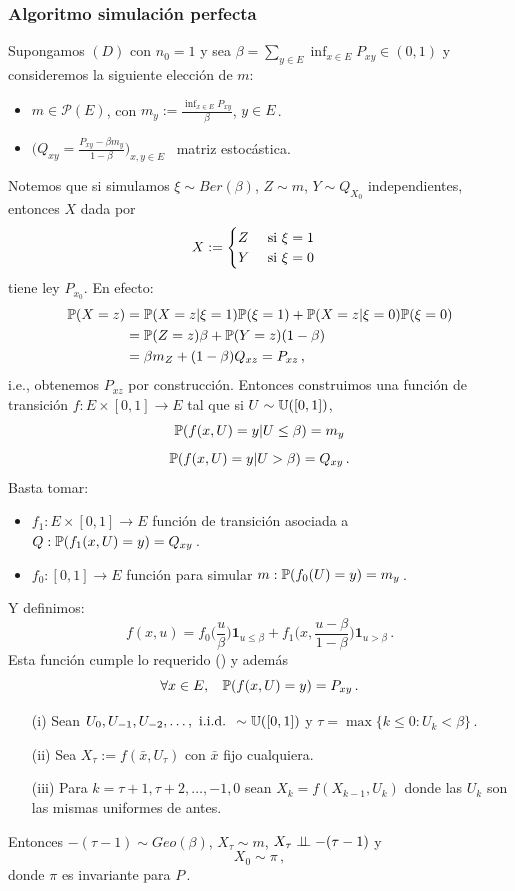 \subsubsection{Algoritmo simulación perfecta}
Supongamos $(D)$ con $n_0=1$ y sea $\beta=\displaystyle\sum_{y\in E}\inf_{x\in E}P_{xy}\in(0,1)$ y consideremos la siguiente elección de $m$:
\begin{itemize}
    \item $m\in\mathcal{P}(E)$, con $m_y:=\displaystyle\frac{\inf_{x\in E}P_{xy}}{\beta}$, $y\in E$\,.
    \item $\bigg(Q_{xy}=\displaystyle\frac{P_{xy}-\beta m_y}{1-\beta}\bigg)_{x,y\in E}$ \, matriz estocástica.
\end{itemize}
Notemos que si simulamos $\xi\sim Ber(\beta)$, $Z\sim m$, $Y\sim Q_{X_0}$ independientes, entonces $X$ dada por 
$$ X:=\begin{cases}
Z
& \mbox{ si }\xi=1\\
Y & \mbox{ si }\xi=0
\end{cases}\espacio $$
 tiene ley $P_{x_0}$. En efecto:
\begin{alignat*}{2}
    \P(X=z) & = \P(X=z|\xi=1)\P(\xi=1)+\P(X=z|\xi=0)\P(\xi=0) \\
     & = \P(Z=z)\beta + \P(Y=z)(1-\beta)\\
     & = \beta m_Z+(1-\beta)Q_{xz} = P_{xz}\,,
\end{alignat*}
i.e., obtenemos $P_{xz}$ por construcción.
\newp Entonces construimos una función de transición $f:E\times [0,1]\to E$ tal que si $U\sim\unif$,
$$ \P(f(x,U)=y|U\leq \beta)=m_y$$
$$ \P(f(x,U)=y|U>\beta)=Q_{xy}\,.$$
Basta tomar:
\begin{itemize}
    \item $f_1:E\times[0,1]\to E$ función de transición asociada a $Q:\P(f_1(x,U)=y)=Q_{xy}$\,.
    \item $f_0:[0,1]\to E$ función para simular $m:\P(f_0(U)=y)=m_y$\,.
\end{itemize}
Y definimos: 
$$f(x,u)=f_0\bigg(\frac{u}{\beta}\bigg)\mathbf{1}_{u\leq\beta}+f_1\bigg(x,\frac{u-\beta}{1-\beta}\bigg)\mathbf{1}_{u>\beta}\, .$$
Esta función cumple lo requerido (\ejercicio) y además 
$$\forall x\in E,\espacio \P(f(x,U)=y)=P_{xy}\,.$$
\begin{theorem}
\beforeitemize
\begin{enumerate}
    \item[(i)] Sean $U_0,U_{-1},U_{-2},\dots,\iid\sim\unif$ y $\tau=\max\{k\leq 0:U_k<\beta\}$\,.
    \item[(ii)] Sea $X_\tau:=f(\bar{x},U_\tau)$ con $\bar{x}$ fijo cualquiera.
    \item[(iii)] Para $k=\tau+1,\tau+2,\dots,-1,0$ sean $X_k=f(X_{k-1},U_k)$ donde las $U_k$ son las mismas uniformes de antes.  %
\end{enumerate}
Entonces $-(\tau-1)\sim Geo(\beta)$, $X_\tau\sim m$, $X_\tau\indep-(\tau-1)$ y  %
$$ X_0\sim\pi\,,$$
donde $\pi$ es invariante para $P$\,.
\end{theorem}
